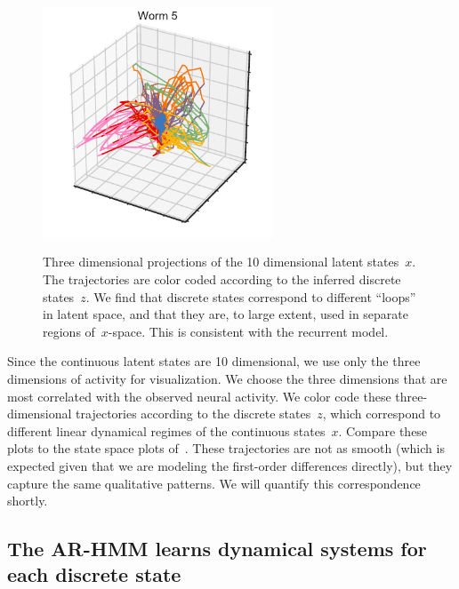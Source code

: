 \documentclass{article}
\begin{document}
\begin{figure}[h]
\\
\includegraphics[width=2.7in]{figures/arhmm/x_3d_5.pdf} 
\caption{Three dimensional projections of the 10 dimensional
  latent states~$x$. The trajectories are color coded
  according to the inferred discrete states~$z$.  We find
  that discrete states correspond to different ``loops''
  in latent space, and that they are, to large extent,
  used in separate regions of~$x$-space.  This is consistent
  with the recurrent model.}
\end{figure}

Since the continuous latent states are 10 dimensional, we use only the
three dimensions of activity for visualization.  We choose the three
dimensions that are most correlated with the observed neural activity.
We color code these three-dimensional trajectories according to the
discrete states~$z$, which correspond to different linear dynamical
regimes of the continuous states~$x$. Compare these plots to the state
space plots of~\citet{kato2015global}. These trajectories are not as
smooth (which is expected given that we are modeling the first-order
differences directly), but they capture the same qualitative patterns.
We will quantify this correspondence shortly. 

\clearpage

\subsection{The AR-HMM learns dynamical systems for each discrete state}
\end{document}

